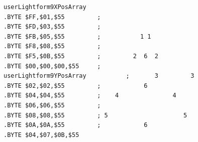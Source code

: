 \begin{minipage}[b]{0.48\linewidth}
\begin{lrbox}{\mybox}%
\hspace{1cm}
\begin{lstlisting}[basicstyle=\ttfamily\tiny,escapechar=\%]
userLightform9XPosArray
.BYTE $FF,$01,$55         ;                        
.BYTE $FD,$03,$55         ;                        
.BYTE $FB,$05,$55         ;           1 1          
.BYTE $F8,$08,$55         ;                        
.BYTE $F5,$0B,$55         ;         2  6  2        
.BYTE $00,$00,$00,$55     ;                        
userLightform9YPosArray           ;       3         3      
.BYTE $02,$02,$55         ;            6           
.BYTE $04,$04,$55         ;    4               4   
.BYTE $06,$06,$55         ;                        
.BYTE $08,$08,$55         ; 5                     5
.BYTE $0A,$0A,$55         ;            6           
.BYTE $04,$07,$0B,$55
\end{lstlisting}
\end{lrbox}%
\scalebox{0.8}{\usebox{\mybox}}

\end{minipage}
%
%
